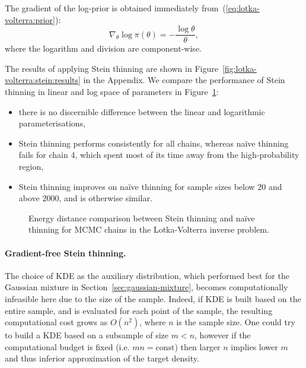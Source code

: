 \documentclass[11pt,a4paper]{report}
\begin{document}
The gradient of the log-prior is obtained immediately from~(\ref{eq:lotka-volterra:prior}):
\begin{equation*}
\nabla_{\theta} \log \pi(\theta) = -\frac{\log \theta}{\theta},
\end{equation*}
where the logarithm and division are component-wise.

The results of applying Stein thinning are shown in Figure~\ref{fig:lotka-volterra:stein:results} in the Appendix. We compare the performance of Stein thinning in linear and log space of parameters in Figure~\ref{fig:lotka-volterra:stein-thinning:energy-distance}:
\begin{itemize}
\item there is no discernible difference between the linear and logarithmic parameterisations,
\item Stein thinning performs consistently for all chains, whereas na\"ive thinning fails for chain 4, which spent most of its time away from the high-probability region,
\item Stein thinning improves on na\"ive thinning for sample sizes below 20 and above 2000, and is otherwise similar.
\end{itemize}

\begin{figure}[h]
\centering
{}
\caption{Energy distance comparison between Stein thinning and na\"ive thinning for MCMC chains in the Lotka-Volterra inverse problem.
\label{fig:lotka-volterra:stein-thinning:energy-distance}}
\end{figure}

\paragraph{Gradient-free Stein thinning.} The choice of KDE as the auxiliary distribution, which performed best for the Gaussian mixture in Section~\ref{sec:gaussian-mixture}, becomes computationally infeasible here due to the size of the sample. Indeed, if KDE is built based on the entire sample, and is evaluated for each point of the sample, the resulting computational cost grows as $O(n^2)$, where $n$ is the sample size. One could try to build a KDE based on a subsample of size $m < n$, however if the computational budget is fixed (i.e. $mn = \text{const}$) then larger $n$ implies lower $m$ and thus inferior approximation of the target density.
\end{document}
